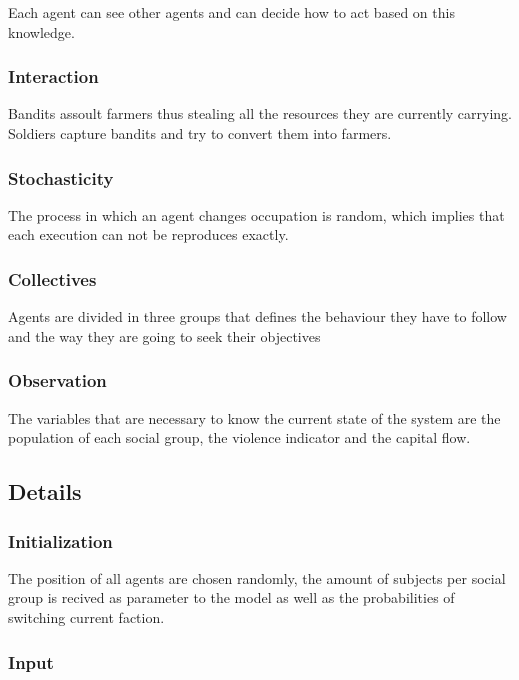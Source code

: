 \documentclass{wscpaperproc}
\theoremstyle{wsc}
\begin{document}
Each agent can see other agents and can decide how to act based on this
knowledge.

\subsubsection{Interaction}

Bandits assoult farmers thus stealing all the resources they are currently
carrying. Soldiers capture bandits and try to convert them into farmers.

\subsubsection{Stochasticity}

The process in which an agent changes occupation is random, which implies that
each execution can not be reproduces exactly.

\subsubsection{Collectives}

Agents are divided in three groups that defines the behaviour they have to
follow and the way they are going to seek their objectives

\subsubsection{Observation}

The variables that are necessary to know the current state of the system are
the population of each social group, the violence indicator and the capital
flow.

\subsection{Details}

\subsubsection{Initialization}

The position of all agents are chosen randomly, the amount of subjects per
social group is recived as parameter to the model as well as the probabilities
of switching current faction.

\subsubsection{Input}
\end{document}
